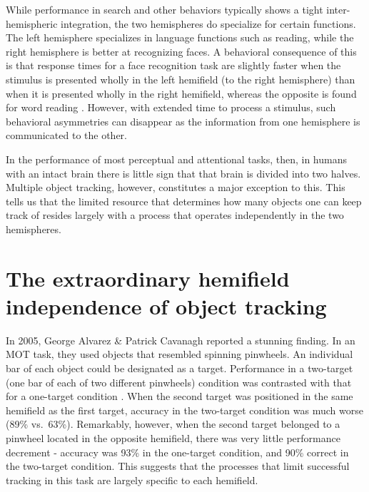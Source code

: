 \documentclass[
]{book}
\begin{document}
While performance in search and other behaviors typically shows a tight inter-hemispheric integration, the two hemispheres do specialize for certain functions. The left hemisphere specializes in language functions such as reading, while the right hemisphere is better at recognizing faces. A behavioral consequence of this is that response times for a face recognition task are slightly faster when the stimulus is presented wholly in the left hemifield (to the right hemisphere) than when it is presented wholly in the right hemifield, whereas the opposite is found for word reading \citep{rizzolattiOppositeSuperioritiesRight1971}. However, with extended time to process a stimulus, such behavioral asymmetries can disappear as the information from one hemisphere is communicated to the other.

In the performance of most perceptual and attentional tasks, then, in humans with an intact brain there is little sign that that brain is divided into two halves. Multiple object tracking, however, constitutes a major exception to this. This tells us that the limited resource that determines how many objects one can keep track of resides largely with a process that operates independently in the two hemispheres.

\hypertarget{the-extraordinary-hemifield-independence-of-object-tracking}{%
\section{The extraordinary hemifield independence of object tracking}\label{the-extraordinary-hemifield-independence-of-object-tracking}}

In 2005, George Alvarez \& Patrick Cavanagh reported a stunning finding. In an MOT task, they used objects that resembled spinning pinwheels. An individual bar of each object could be designated as a target. Performance in a two-target (one bar of each of two different pinwheels) condition was contrasted with that for a one-target condition \citep{alvarezIndependentResourcesAttentional2005}. When the second target was positioned in the same hemifield as the first target, accuracy in the two-target condition was much worse (89\% vs.~63\%). Remarkably, however, when the second target belonged to a pinwheel located in the opposite hemifield, there was very little performance decrement - accuracy was 93\% in the one-target condition, and 90\% correct in the two-target condition. This suggests that the processes that limit successful tracking in this task are largely specific to each hemifield.
\end{document}
